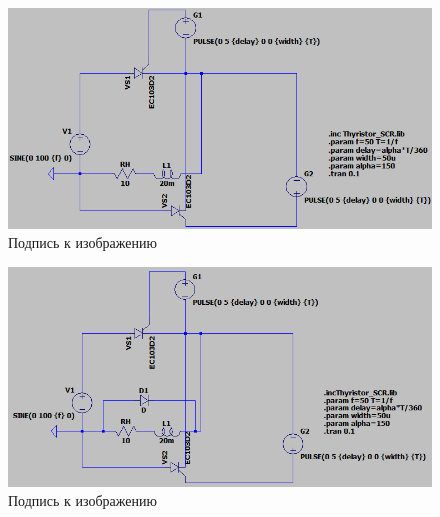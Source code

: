 \documentclass[a4paper, 12pt]{article}
\begin{document}
    \begin{figure}[H]
        \centering
        \includegraphics[scale=0.5]{scheme2.png}
        \captionsetup{skip=0pt}
        \caption{Подпись к изображению}
        \label{fig:scheme2}
    \end{figure}


    \begin{figure}[H]
        \centering
        \includegraphics[scale=0.5]{scheme3.png}
        \captionsetup{skip=0pt}
        \caption{Подпись к изображению}
        \label{fig:scheme3}
    \end{figure}
\end{document}
